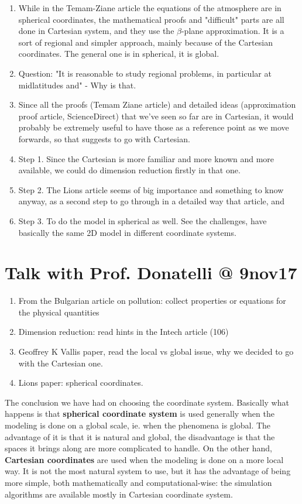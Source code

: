 \documentclass{article}
\begin{document}
\begin{enumerate}
\item While in the Temam-Ziane article the equations of the atmosphere are in spherical coordinates, the mathematical proofs and "difficult" parts are all done in Cartesian system, and they use the $\beta$-plane approximation. It is a sort of regional and simpler approach, mainly because of the Cartesian coordinates. The general one is in spherical, it is global.
\item Question: "It is reasonable to study regional problems, in particular at midlatitudes and" - Why is that.
\item Since all the proofs (Temam Ziane article) and detailed ideas (approximation proof article, ScienceDirect) that we've seen so far are in Cartesian, it would probably be extremely useful to have those as a reference point as we move forwards, so that suggests to go with Cartesian.
\item Step 1. Since the Cartesian is more familiar and more known and more available, we could do dimension reduction firstly in that one.
\item Step 2. The Lions article seems of big importance and something to know anyway, as a second step to go through in a detailed way that article, and
\item Step 3. To do the model in spherical as well. See the challenges, have basically the same 2D model in different coordinate systems.
\end{enumerate}



\section{Talk with Prof. Donatelli @ 9nov17}

\begin{enumerate}
\item From the Bulgarian article on pollution: collect properties or equations for the physical quantities
\item Dimension reduction: read hints in the Intech article (106)
\item Geoffrey K Vallis paper, read the local vs global issue, why we decided to go with the Cartesian one.
\item Lions paper: spherical coordinates.
\end{enumerate}

The conclusion we have had on choosing the coordinate system. Basically what happens is that \textbf{spherical coordinate system} is used generally when the modeling is done on a global scale, ie. when the phenomena is global. The advantage of it is that it is natural and global, the disadvantage is that the spaces it brings along are more complicated to handle. On the other hand, \textbf{Cartesian coordinates} are used when the modeling is done on a more local way. It is not the most natural system to use, but it has the advantage of being more simple, both mathematically and computational-wise: the simulation algorithms are available mostly in Cartesian coordinate system.
\end{document}
